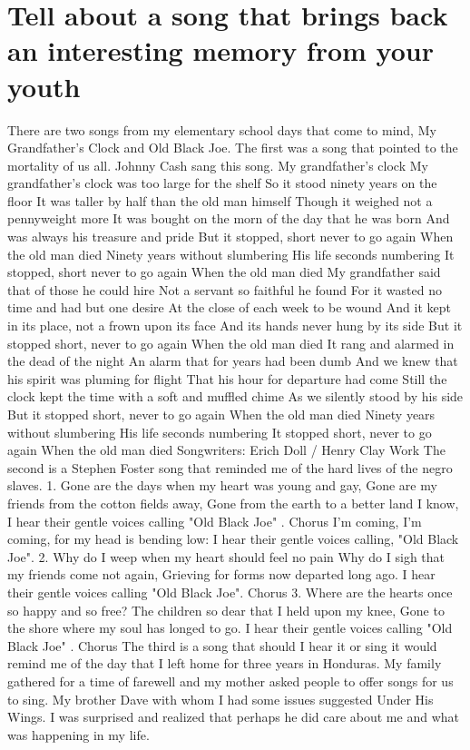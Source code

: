 \section{Tell about a song that brings back an interesting memory from your youth}
There are two songs from my elementary school days that come to mind, My Grandfather's Clock and Old Black Joe. The first was a song that pointed to the mortality of us all. Johnny Cash sang this song.
My grandfather's clock
My grandfather's clock was too large for the shelf
So it stood ninety years on the floor
It was taller by half than the old man himself
Though it weighed not a pennyweight more
It was bought on the morn of the day that he was born
And was always his treasure and pride
But it stopped, short never to go again
When the old man died
Ninety years without slumbering
His life seconds numbering
It stopped, short never to go again
When the old man died
My grandfather said that of those he could hire
Not a servant so faithful he found
For it wasted no time and had but one desire
At the close of each week to be wound
And it kept in its place, not a frown upon its face
And its hands never hung by its side
But it stopped short, never to go again
When the old man died
It rang and alarmed in the dead of the night
An alarm that for years had been dumb
And we knew that his spirit was pluming for flight
That his hour for departure had come
Still the clock kept the time with a soft and muffled chime
As we silently stood by his side
But it stopped short, never to go again
When the old man died
Ninety years without slumbering
His life seconds numbering
It stopped short, never to go again
When the old man died
Songwriters: Erich Doll / Henry Clay Work
The second is a Stephen Foster song that reminded me of the hard lives of the negro slaves.
1. Gone are the days when my heart was young and gay, Gone are my friends from the cotton fields away, Gone from the earth to a better land I know, I hear their gentle voices calling "Old Black Joe" . 
Chorus I'm coming, I'm coming, for my head is bending low: I hear their gentle voices calling, "Old Black Joe". 
2. Why do I weep when my heart should feel no pain Why do I sigh that my friends come not again, Grieving for forms now departed long ago. I hear their gentle voices calling "Old Black Joe". Chorus 
3. Where are the hearts once so happy and so free? The children so dear that I held upon my knee, Gone to the shore where my soul has longed to go. I hear their gentle voices calling "Old Black Joe" . Chorus
The third is a song that should I hear it or sing it would remind me of the day that I left home for three years in Honduras. My family gathered for a time of farewell and my mother asked people to offer songs for us to sing. My brother Dave with whom I had some issues suggested Under His Wings. I was surprised and realized that perhaps he did care about me and what was happening in my life. 
